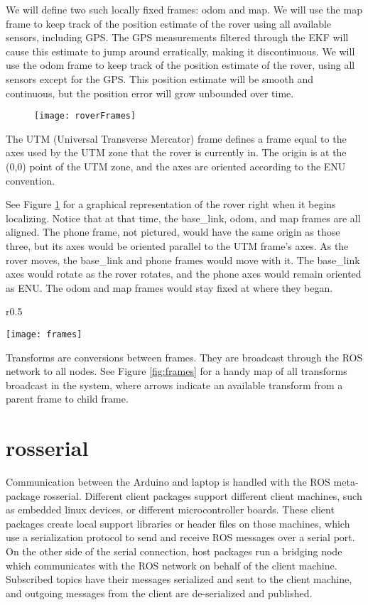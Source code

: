 We will define two such locally fixed frames: odom and map. We will use the map frame to keep track of the position estimate of the rover using all available sensors, including GPS. The GPS measurements filtered through the EKF will cause this estimate to jump around erratically, making it discontinuous. We will use the odom frame to keep track of the position estimate of the rover, using all sensors except for the GPS. This position estimate will be smooth and continuous, but the position error will grow unbounded over time.

\begin{figure}[h]
	\caption{\cite{robot_localization_wiki}}
	\label{fig:roverFrames}
	\centering
	\texttt{[image: roverFrames]}
\end{figure}

The UTM (Universal Transverse Mercator) frame defines a frame equal to the axes used by the UTM zone that the rover is currently in. The origin is at the (0,0) point of the UTM zone, and the axes are oriented according to the ENU convention. 

See Figure \ref{fig:roverFrames} for a graphical representation of the rover right when it begins localizing. Notice that at that time, the base\_link, odom, and map frames are all aligned. The phone frame, not pictured, would have the same origin as those three, but its axes would be oriented parallel to the UTM frame's axes. As the rover moves, the base\_link and phone frames would move with it. The base\_link axes would rotate as the rover rotates, and the phone axes would remain oriented as ENU. The odom and map frames would stay fixed at where they began. 

\begin{wrapfigure}{r}{0.5\textwidth}
	\caption{Frames}
	\centering
	\texttt{[image: frames]}
	\label{fig:frames}
\end{wrapfigure}

Transforms are conversions between frames. They are broadcast through the ROS network to all nodes. See Figure \ref{fig:frames} for a handy map of all transforms broadcast in the system, where arrows indicate an available transform from a parent frame to child frame.

\section{rosserial} \label{sectionRosSerial}
Communication between the Arduino and laptop is handled with the ROS meta-package rosserial. Different client packages support different client machines, such as embedded linux devices, or different microcontroller boards. These client packages create local support libraries or header files on those machines, which use a serialization protocol to send and receive ROS messages over a serial port. On the other side of the serial connection, host packages run a bridging node which communicates with the ROS network on behalf of the client machine. Subscribed topics have their messages serialized and sent to the client machine, and outgoing messages from the client are de-serialized and published. 

